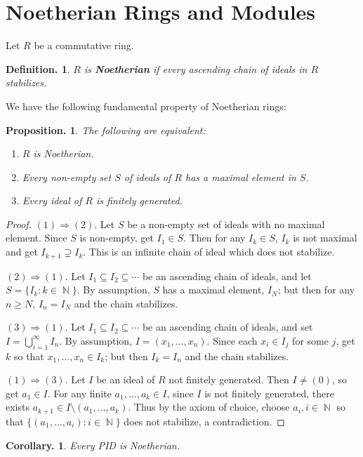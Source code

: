 \documentclass[11pt, a4paper]{memoir}
\DeclareMathOperator{\N}{{\mathbb{N}}}
\theoremstyle{change}
\newtheorem{corollary}[theorem]{Corollary.}
\newtheorem{proposition}[theorem]{Proposition.}
\theoremstyle{plain}
\theoremstyle{nonumberplain}
\newtheorem{definition}{Definition.}
\newtheorem{proof}{Proof}
\numberwithin{equation}{section}
\begin{document}
\section{Noetherian Rings and Modules}
Let $R$ be a commutative ring.
\begin{definition}
    $R$ is \textbf{Noetherian} if every ascending chain of ideals in $R$ stabilizes.
\end{definition}
We have the following fundamental property of Noetherian rings:
\begin{proposition}\label{noe}
    The following are equivalent:
    \begin{enumerate}[nolistsep]
        \item $R$ is Noetherian.
        \item Every non-empty set $S$ of ideals of $R$ has a maximal element in $S$.
        \item Every ideal of $R$ is finitely generated.
    \end{enumerate}
\end{proposition}
\begin{proof}
    $(1)\Rightarrow (2)$.
    Let $S$ be a non-empty set of ideals with no maximal element.
    Since $S$ is non-empty, get $I_1\in S$.
    Then for any $I_k\in S$, $I_k$ is not maximal and get $I_{k+1}\supsetneq I_k$.
    This is an infinite chain of ideal which does not stabilize.

    $(2)\Rightarrow(1)$.
    Let $I_1\subseteq I_2\subseteq\cdots$ be an ascending chain of ideals, and let $S=\{I_k:k\in\N\}$.
    By assumption, $S$ has a maximal element, $I_N$; but then for any $n\geq N$, $I_n=I_N$ and the chain stabilizes.

    $(3)\Rightarrow(1)$.
    Let $I_1\subseteq I_2\subseteq\cdots$ be an ascending chain of ideals, and set $I=\bigcup_{i=1}^\infty I_n$.
    By assumption, $I=(x_1,\ldots,x_n)$.
    Since each $x_i\in I_j$ for some $j$, get $k$ so that $x_1,\ldots,x_n\in I_k$; but then $I_k=I_n$ and the chain stabilizes.

    $(1)\Rightarrow(3)$.
    Let $I$ be an ideal of $R$ not finitely generated.
    Then $I\neq(0)$, so get $a_1\in I$.
    For any finite $a_1,\ldots,a_k\in I$, since $I$ is not finitely generated, there exists $a_{k+1}\in I\setminus(a_1,\ldots,a_k)$.
    Thus by the axiom of choice, choose $a_i,i\in\N$ so that $\{(a_1,\ldots,a_i):i\in\N\}$ does not stabilize, a contradiction.
\end{proof}
\begin{corollary}
    Every PID is Noetherian.
\end{corollary}
\end{document}
